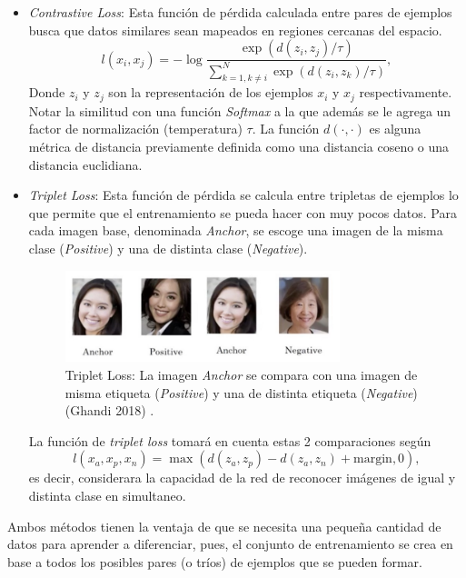 \begin{itemize}
    \item \textit{Contrastive Loss}: Esta función de pérdida calculada entre pares de ejemplos busca que datos similares sean mapeados en regiones cercanas del espacio.
    \[
    l(x_i , x_j) = -\log\frac{\exp(d(z_i , z_j)/\tau)}{\sum_{k=1 , k \neq i}^N \exp(d(z_i , z_k)/\tau)} , 
    \]
    Donde $z_i$ y $z_j$ son la representación de los ejemplos $x_i$ y $x_j$ respectivamente. Notar la similitud con una función \textit{Softmax} a la que además se le agrega un factor de normalización (temperatura) $\tau$. La función $d(\cdot, \cdot)$ es alguna métrica de distancia previamente  definida como una distancia coseno o una distancia euclidiana. 
    
    \item \textit{Triplet Loss}: Esta función de pérdida se calcula entre tripletas de ejemplos lo que permite que el entrenamiento se pueda hacer con muy pocos datos. Para cada imagen base, denominada \textit{Anchor}, se escoge una imagen de la misma clase (\textit{Positive}) y una de distinta clase (\textit{Negative}).
    
    \begin{figure}[ht]
    \centering
    \includegraphics[width=8cm]{img/tesis/triplet_loss.jpeg}
    \caption{Triplet Loss: La imagen \textit{Anchor} se compara con una imagen de misma etiqueta (\textit{Positive}) y una de distinta etiqueta (\textit{Negative}) (Ghandi 2018) \cite{TripletLoss}.}
    \label{fig:triplet_loss}
    \end{figure}
    
    \noindent La función de \textit{triplet loss} tomará en cuenta estas 2 comparaciones según
    \[
    l(x_a , x_p, x_n) = \max(d(z_a, z_p) - d(z_a, z_n) + \text{margin} , 0) , 
    \]
    es decir, considerara la capacidad de la red de reconocer imágenes de igual y distinta clase en simultaneo. 
    
    
\end{itemize}

Ambos métodos tienen la ventaja de que se necesita una pequeña cantidad de datos para aprender a diferenciar, pues, el conjunto de entrenamiento se crea en base a todos los posibles pares (o tríos) de ejemplos que se pueden formar.






